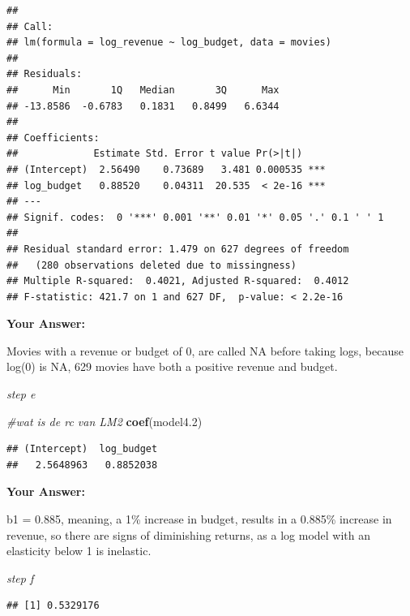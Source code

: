 \documentclass[
]{article}
\newenvironment{Shaded}{\begin{snugshade}}{\end{snugshade}}
\newcommand{\CommentTok}[1]{\textcolor[rgb]{0.56,0.35,0.01}{\textit{#1}}}
\newcommand{\FloatTok}[1]{\textcolor[rgb]{0.00,0.00,0.81}{#1}}
\newcommand{\FunctionTok}[1]{\textcolor[rgb]{0.13,0.29,0.53}{\textbf{#1}}}
\newcommand{\NormalTok}[1]{#1}
\newcommand{\SpecialCharTok}[1]{\textcolor[rgb]{0.81,0.36,0.00}{\textbf{#1}}}
\begin{document}
\begin{verbatim}
## 
## Call:
## lm(formula = log_revenue ~ log_budget, data = movies)
## 
## Residuals:
##      Min       1Q   Median       3Q      Max 
## -13.8586  -0.6783   0.1831   0.8499   6.6344 
## 
## Coefficients:
##             Estimate Std. Error t value Pr(>|t|)    
## (Intercept)  2.56490    0.73689   3.481 0.000535 ***
## log_budget   0.88520    0.04311  20.535  < 2e-16 ***
## ---
## Signif. codes:  0 '***' 0.001 '**' 0.01 '*' 0.05 '.' 0.1 ' ' 1
## 
## Residual standard error: 1.479 on 627 degrees of freedom
##   (280 observations deleted due to missingness)
## Multiple R-squared:  0.4021, Adjusted R-squared:  0.4012 
## F-statistic: 421.7 on 1 and 627 DF,  p-value: < 2.2e-16
\end{verbatim}

\textbf{Your Answer:}

Movies with a revenue or budget of 0, are called NA before taking logs,
because log(0) is NA, 629 movies have both a positive revenue and
budget.

\emph{step e}

\begin{Shaded}
\begin{Highlighting}[]
\CommentTok{\#wat is de rc van LM2}
\FunctionTok{coef}\NormalTok{(model4}\FloatTok{.2}\NormalTok{)}
\end{Highlighting}
\end{Shaded}

\begin{verbatim}
## (Intercept)  log_budget 
##   2.5648963   0.8852038
\end{verbatim}

\textbf{Your Answer:}

b1 = 0.885, meaning, a 1\% increase in budget, results in a 0.885\%
increase in revenue, so there are signs of diminishing returns, as a log
model with an elasticity below 1 is inelastic.

\emph{step f}

\begin{Shaded}
\end{Shaded}

\begin{verbatim}
## [1] 0.5329176
\end{verbatim}
\end{document}
